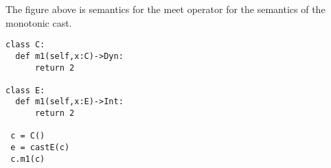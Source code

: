 \documentclass[a4paper,UKenglish,final]{tex/lipics-v2016}
\begin{document}
\hrulefill

The figure above is semantics for the meet operator for the semantics of the monotonic cast.

\begin{verbatim}
class C:
  def m1(self,x:C)->Dyn:
      return 2

class E:
  def m1(self,x:E)->Int:
      return 2

 c = C()
 e = castE(c)
 c.m1(c)
\end{verbatim}


\hrulefill

\begin{mathpar}


\end{mathpar}

\hrulefill

\begin{mathpar}
\end{mathpar}

\hrulefill

\begin{mathpar}
\end{mathpar}

\hrulefill
\end{document}
